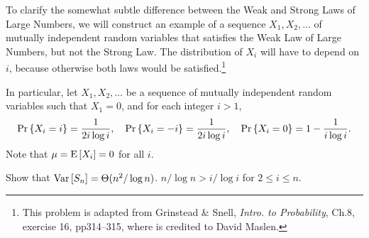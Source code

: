 \documentclass[11pt]{article}
\begin{document}
\begin{problem}
To clarify the somewhat subtle difference between the Weak and Strong Laws
of Large Numbers, we will construct an example of a sequence
$X_1,X_2,\dots$ of mutually independent random variables that satisfies
the Weak Law of Large Numbers, but not the Strong Law.  The distribution
of $X_i$ will have to depend on $i$, because otherwise both laws would be
satisfied.\footnote{This problem is adapted from Grinstead \& Snell,
\emph{Intro. to Probability}, Ch.8, exercise 16, pp314--315, where is
credited to David Maslen.}

In particular, let $X_1,X_2,\dots$ be a sequence of mutually independent
random variables such that $X_1=0$, and for each integer $i > 1$,
\[
\mathop{\textup{Pr}}\nolimits\left\{X_i=i\right\} = \frac{1}{2i\log i},\quad
\mathop{\textup{Pr}}\nolimits\left\{X_i=-i\right\} = \frac{1}{2i\log i},\quad
\mathop{\textup{Pr}}\nolimits\left\{X_i=0\right\} = 1 - \frac{1}{i\log i}.
\]
Note that $\mu = \mathop{\textup{E}}\nolimits\left[X_i\right] = 0$ for all $i$.

\bparts

\problempart
Show that $\mathop{\textup{Var}}\nolimits\left[S_n\right] = \Theta(n^2/\log n)$.
\hint $n/\log n > i/\log i$ for $2 \leq i \leq n$. %



\end{problem}
\end{document}
